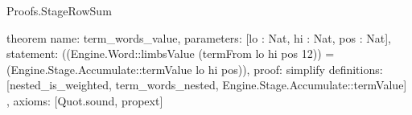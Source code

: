 \begin{lexlean}{Proofs.StageRowSum}
\begin{semanticmodule}
theorem{
  name: term_words_value,
  parameters: [lo : Nat, hi : Nat, pos : Nat],
  statement: ((Engine.Word::limbsValue (termFrom lo hi pos 12)) = (Engine.Stage.Accumulate::termValue lo hi pos)),
  proof: simplify{
    definitions: [nested_is_weighted, term_words_nested, Engine.Stage.Accumulate::termValue]
  },
  axioms: [Quot.sound, propext]
}
\end{semanticmodule}
\end{lexlean}
